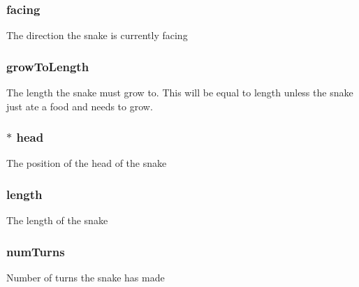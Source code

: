 \subsubsection[{\texorpdfstring{facing}{facing}}]{ facing}\hypertarget{struct_snake_a8353069dfd601a3f9aa2fef0a15cd5fd}{}\label{struct_snake_a8353069dfd601a3f9aa2fef0a15cd5fd}
The direction the snake is currently facing 
\subsubsection[{\texorpdfstring{grow\+To\+Length}{growToLength}}]{ grow\+To\+Length}\hypertarget{struct_snake_ad7b38e6e181a7fc796cdb9dded9878d9}{}\label{struct_snake_ad7b38e6e181a7fc796cdb9dded9878d9}
The length the snake must grow to. This will be equal to length unless the snake just ate a food and needs to grow. 
\subsubsection[{\texorpdfstring{head}{head}}]{$\ast$ head}\hypertarget{struct_snake_accdccb4805540fdd3b0380f2f3ed5796}{}\label{struct_snake_accdccb4805540fdd3b0380f2f3ed5796}
The position of the head of the snake 
\subsubsection[{\texorpdfstring{length}{length}}]{ length}\hypertarget{struct_snake_a205e2b97fe60d899412ca79655cc064c}{}\label{struct_snake_a205e2b97fe60d899412ca79655cc064c}
The length of the snake 
\subsubsection[{\texorpdfstring{num\+Turns}{numTurns}}]{ num\+Turns}\hypertarget{struct_snake_a4bff3104a813408b17c1f687e1461f81}{}\label{struct_snake_a4bff3104a813408b17c1f687e1461f81}
Number of turns the snake has made 
